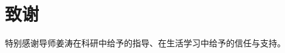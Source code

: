 \documentclass[lang=cn,11pt,a4paper]{elegantpaper}
\begin{document}














\section{致谢}
特别感谢导师姜涛在科研中给予的指导、在生活学习中给予的信任与支持。
\end{document}

